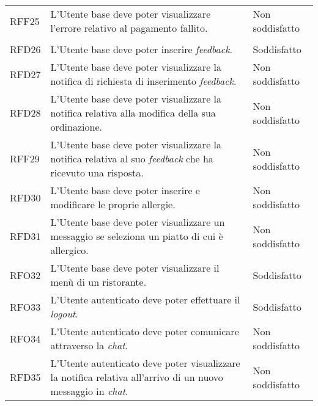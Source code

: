 \begin{longtable}{|l|p{}|p{3cm}|}
	\hline
	RFF25       & L'Utente base deve poter visualizzare l'errore relativo al pagamento fallito.                                  		& Non soddisfatto                                                                \\                                                                                                                                                                             \\
	\hline
	RFD26       & L'Utente base deve poter inserire \textit{feedback}.                                                                 & Soddisfatto                                                     \\
	\hline
	RFD27       & L'Utente base deve poter visualizzare la notifica di richiesta di inserimento \textit{feedback}.                     & Non soddisfatto         \\
	\hline
	RFD28       & L'Utente base deve poter visualizzare la notifica relativa alla modifica della sua ordinazione.                      & Non soddisfatto                               \\
	\hline
	RFF29       & L'Utente base deve poter visualizzare la notifica relativa al suo \textit{feedback} che ha ricevuto una risposta.    & Non soddisfatto                                  \\
	\hline
	RFD30       & L'Utente base deve poter inserire e modificare le proprie allergie.                                                  & Non soddisfatto \\
	\hline
	RFD31       & L'Utente base deve poter visualizzare un messaggio se seleziona un piatto di cui è allergico.                        & Non soddisfatto        \\
	\hline
	RFO32       & L'Utente base deve poter visualizzare il menù di un ristorante.                                                      & Soddisfatto                                                        \\
	\hline
	RFO33       & L'Utente autenticato deve poter effettuare il \textit{logout}.                                                       & Soddisfatto                                                             \\
	\hline
	RFO34       & L'Utente autenticato deve poter comunicare attraverso la \textit{chat}.                                              & Non soddisfatto                                               \\
	\hline
	RFD35       & L'Utente autenticato deve poter visualizzare la notifica relativa all'arrivo di un nuovo messaggio in \textit{chat}. & Non soddisfatto                            \\

\end{longtable}
